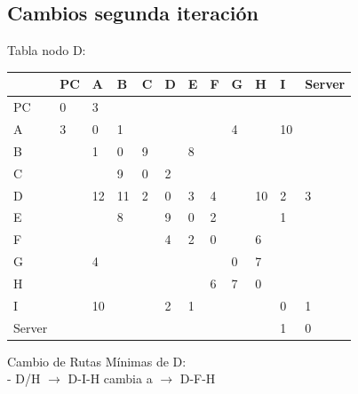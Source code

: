 \documentclass[a4paper]{article}
\begin{document}
\clearpage

\subsection{Cambios segunda iteración}

\begin{table}[h]
Tabla nodo D:\\
\begin{tabular}{|l|l|l|l|l|l|l|l|l|l|l|l|}
\hline
       & PC & A  & B  & C & D & E & F & G & H  & I  & Server \\ \hline
PC     & 0  & 3  &    &   &   &   &   &   &    &    &        \\ \hline
A      & 3  & 0  & 1  &   &   &   &   & 4 &    & 10 &        \\ \hline
B      &    & 1  & 0  & 9 &   & 8 &   &   &    &    &        \\ \hline
C      &    &    & 9  & 0 & 2 &   &   &   &    &    &        \\ \hline
D      &    & 12 & 11 & 2 & 0 & 3 & 4 &   & 10 & 2  & 3      \\ \hline
E      &    &    & 8  &   & 9 & 0 & 2 &   &    & 1  &        \\ \hline
F      &    &    &    &   & 4 & 2 & 0 &   & 6  &    &        \\ \hline
G      &    & 4  &    &   &   &   &   & 0 & 7  &    &        \\ \hline
H      &    &    &    &   &   &   & 6 & 7 & 0  &    &        \\ \hline
I      &    & 10 &    &   & 2 & 1 &   &   &    & 0  & 1      \\ \hline
Server &    &    &    &   &   &   &   &   &    & 1  & 0      \\ \hline
\end{tabular}

Cambio de Rutas Mínimas de D:\\
-	D/H  $\rightarrow$  D-I-H   cambia a  $\rightarrow$  D-F-H

\end{table}

\clearpage
\end{document}
